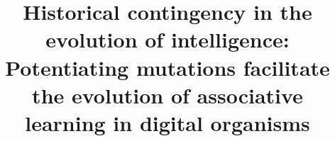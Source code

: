 \title{Historical contingency in the evolution of intelligence: Potentiating mutations facilitate the evolution of associative learning in digital organisms}


%
%



% 

% 


